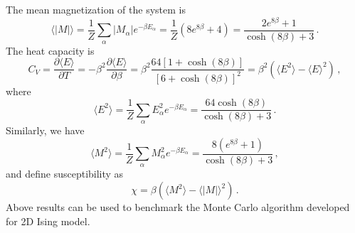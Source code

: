 The mean magnetization of the system is 
\begin{equation}
\langle|M|\rangle=\frac{1}{Z}\sum_{\alpha} |M_\alpha| e^{-\beta E_\alpha}=\frac{1}{Z}\left(8e^{8\beta}+4\right)
=\frac{2e^{8\beta}+1}{\cosh\left(8\beta\right)+3}\,. 
\end{equation}
The heat capacity is 
\begin{equation}\label{eq:cv}
C_V=\frac{\partial \langle E\rangle}{\partial T}=-\beta^2\frac{\partial \langle E\rangle}{\partial \beta}
=\beta^2\frac{64\left[1+\cosh\left(8\beta\right)\right]}{\left[6+\cosh\left(8\beta\right)\right]^2}
=\beta^2\left(\langle E^2\rangle-\langle E\rangle^2\right)\,,
\end{equation}
where 
\begin{equation}
\langle E^2\rangle=\frac{1}{Z}\sum_{\alpha}E^2_\alpha e^{-\beta E_\alpha}=\frac{64\cosh\left(8\beta\right)}{\cosh\left(8\beta\right)+3}\,. 
\end{equation}
Similarly, we have 
\begin{equation}
\langle M^2\rangle=\frac{1}{Z}\sum_{\alpha} M^2_\alpha e^{-\beta E_\alpha}=\frac{8\left(e^{8\beta}+1\right)}{\cosh\left(8\beta\right)+3}\,, 
\end{equation}
and define susceptibility as 
\begin{equation}\label{eq:chi}
\chi=\beta\left(\langle M^2\rangle -\langle |M|\rangle ^2\right)\,. 
\end{equation}
Above results can be used to benchmark the Monte Carlo algorithm developed for 2D Ising model. 

